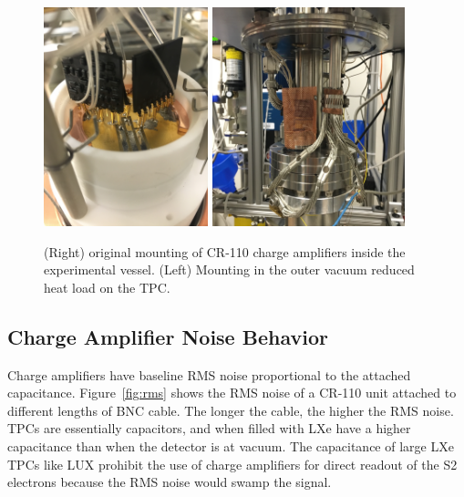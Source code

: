  \begin{figure}[htbp]
\begin{center}
\includegraphics[height=2.5in, keepaspectratio]{figures/testbed/chargeamp_mount1.jpg}
\includegraphics[height=2.5in, keepaspectratio]{figures/testbed/chargeamp_mount2.jpg}
\caption{(Right) original mounting of CR-110 charge amplifiers inside the experimental vessel. (Left) Mounting in the outer vacuum reduced heat load on the TPC.}
\label{fig:chargeamp_mount}
\end{center}
\end{figure}

\subsection{Charge Amplifier Noise Behavior}
Charge amplifiers have baseline RMS noise proportional to the attached capacitance. Figure~\ref{fig:rms} shows the RMS noise of a CR-110 unit attached to different lengths of BNC cable. The longer the cable, the higher the RMS noise. \ac{TPC}s are essentially capacitors, and when filled with \ac{LXe} have a higher capacitance than when the detector is at vacuum. The capacitance of large \ac{LXe} \ac{TPC}s like \ac{LUX} prohibit the use of charge amplifiers for direct readout of the S2 electrons because the RMS noise would swamp the signal. 

